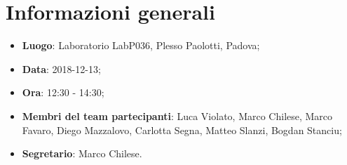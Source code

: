 \section{Informazioni generali}
\begin{itemize}
	\item \textbf{Luogo}: Laboratorio LabP036, Plesso Paolotti, Padova; 
	\item \textbf{Data}: 2018-12-13; 
	\item \textbf{Ora}: 12:30 - 14:30; 
	\item \textbf{Membri del team partecipanti}: Luca Violato, Marco Chilese, Marco Favaro, 	Diego Mazzalovo, Carlotta Segna, Matteo Slanzi, Bogdan Stanciu; 
	\item \textbf{Segretario}: Marco Chilese. 
\end{itemize}






